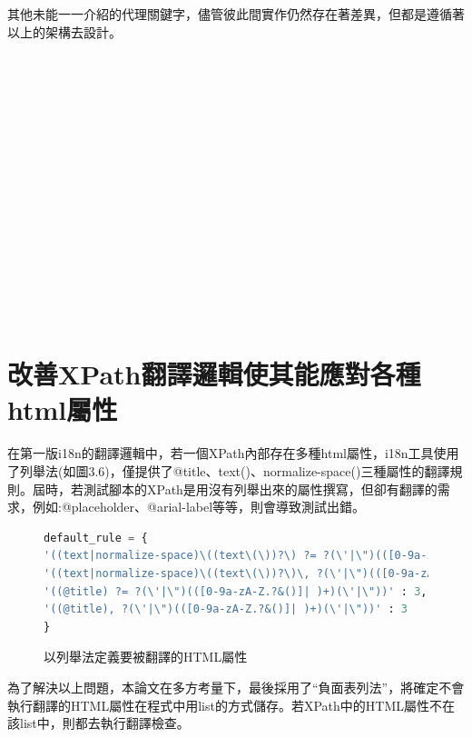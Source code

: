 其他未能一一介紹的代理關鍵字，儘管彼此間實作仍然存在著差異，但都是遵循著以上的架構去設計。


\hspace*{\fill} \\
\\ \hspace*{\fill} \\
\\ \hspace*{\fill} \\
\\ \hspace*{\fill} \\
\\ \hspace*{\fill} \\
\\ \hspace*{\fill} \\
\\ \hspace*{\fill} \\
\\ \hspace*{\fill} \\
\section{改善XPath翻譯邏輯使其能應對各種html屬性}
在第一版i18n的翻譯邏輯中，若一個XPath內部存在多種html屬性，i18n工具使用了列舉法(如圖3.6)，僅提供了@title、text()、normalize-space()三種屬性的翻譯規則。屆時，若測試腳本的XPath是用沒有列舉出來的屬性撰寫，但卻有翻譯的需求，例如:@placeholder、@arial-label等等，則會導致測試出錯。

\begin{figure}[H]
\begin{lstlisting}[language={python}]
default_rule = {
'((text|normalize-space)\((text\(\))?\) ?= ?(\'|\")(([0-9a-zA-Z.?&()]| )+)(\'|\"))': 4,
'((text|normalize-space)\((text\(\))?\)\, ?(\'|\")(([0-9a-zA-Z.?&()]| )+)(\'|\"))': 4,
'((@title) ?= ?(\'|\")(([0-9a-zA-Z.?&()]| )+)(\'|\"))' : 3,
'((@title), ?(\'|\")(([0-9a-zA-Z.?&()]| )+)(\'|\"))' : 3
}
\end{lstlisting}
\caption{以列舉法定義要被翻譯的HTML屬性}
\end{figure}

為了解決以上問題，本論文在多方考量下，最後採用了“負面表列法”，將確定不會執行翻譯的HTML屬性在程式中用list的方式儲存。若XPath中的HTML屬性不在該list中，則都去執行翻譯檢查。

